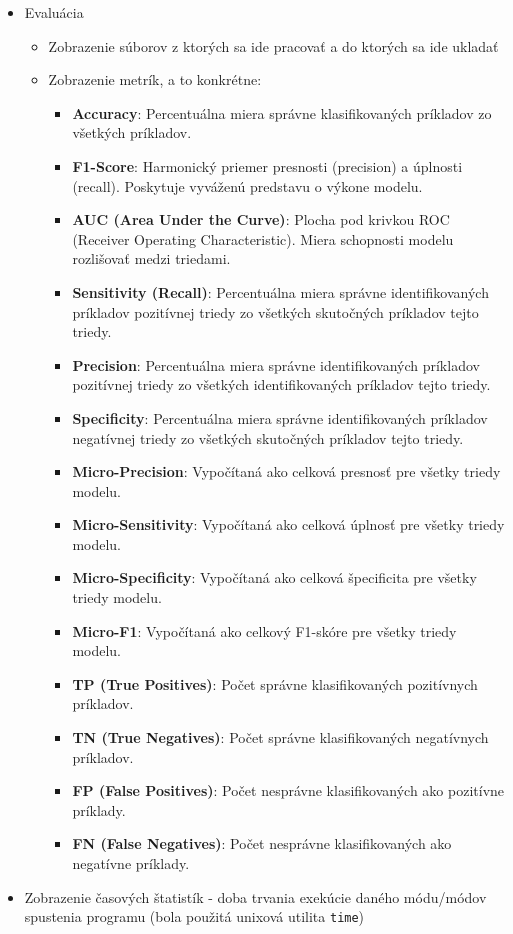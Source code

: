 \documentclass[a4paper, 11pt]{article}
\begin{document}
\begin{itemize}
\item Evaluácia
\begin{itemize}
    \item Zobrazenie súborov z ktorých sa ide pracovať a do ktorých sa ide ukladať
    \item Zobrazenie metrík, a to konkrétne:
\begin{itemize}
    \item \textbf{Accuracy}: Percentuálna miera správne klasifikovaných príkladov zo všetkých príkladov.
    \item \textbf{F1-Score}: Harmonický priemer presnosti (precision) a úplnosti (recall). Poskytuje vyváženú predstavu o výkone modelu.
    \item \textbf{AUC (Area Under the Curve)}: Plocha pod krivkou ROC (Receiver Operating Characteristic). Miera schopnosti modelu rozlišovať medzi triedami.
    \item \textbf{Sensitivity (Recall)}: Percentuálna miera správne identifikovaných príkladov pozitívnej triedy zo všetkých skutočných príkladov tejto triedy.
    \item \textbf{Precision}: Percentuálna miera správne identifikovaných príkladov pozitívnej triedy zo všetkých identifikovaných príkladov tejto triedy.
    \item \textbf{Specificity}: Percentuálna miera správne identifikovaných príkladov negatívnej triedy zo všetkých skutočných príkladov tejto triedy.
    \item \textbf{Micro-Precision}: Vypočítaná ako celková presnosť pre všetky triedy modelu.
    \item \textbf{Micro-Sensitivity}: Vypočítaná ako celková úplnosť pre všetky triedy modelu.
    \item \textbf{Micro-Specificity}: Vypočítaná ako celková špecificita pre všetky triedy modelu.
    \item \textbf{Micro-F1}: Vypočítaná ako celkový F1-skóre pre všetky triedy modelu.
    \item \textbf{TP (True Positives)}: Počet správne klasifikovaných pozitívnych príkladov.
    \item \textbf{TN (True Negatives)}: Počet správne klasifikovaných negatívnych príkladov.
    \item \textbf{FP (False Positives)}: Počet nesprávne klasifikovaných ako pozitívne príklady.
    \item \textbf{FN (False Negatives)}: Počet nesprávne klasifikovaných ako negatívne príklady.
\end{itemize}


\end{itemize}
\item Zobrazenie časových štatistík - doba trvania exekúcie daného módu/módov spustenia programu (bola použitá unixová utilita \verb|time|)
\end{itemize}
\end{document}
